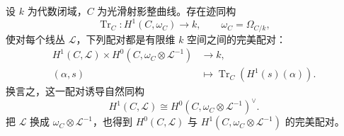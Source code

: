 \begin{theorem}\label{b3:thm:H-serre-duality}
	设 \(k\) 为代数闭域，\(C\) 为光滑射影整曲线。存在迹同构
	\[
		\operatorname{Tr}_C:H^1(C,\omega_C)\longrightarrow k,
		\qquad\omega_C=\Omega_{C/k},
	\]
	使对每个线丛 \(\mathcal L\)，下列配对都是有限维 \(k\) 空间之间的完美配对：
	\[
		\begin{aligned}
			H^1(C,\mathcal L)\times H^0(C,\omega_C\otimes\mathcal L^{-1})
			&\longrightarrow k,\\
			(\alpha,s)&\longmapsto\operatorname{Tr}_C(H^1(s)(\alpha)).
		\end{aligned}
	\]
	换言之，这一配对诱导自然同构
	\[
		H^1(C,\mathcal L)\cong H^0(C,\omega_C\otimes\mathcal L^{-1})^\vee.
	\]
	把 \(\mathcal L\) 换成 \(\omega_C\otimes\mathcal L^{-1}\)，也得到 \(H^0(C,\mathcal L)\) 与 \(H^1(C,\omega_C\otimes\mathcal L^{-1})\) 的完美配对。
\end{theorem}
